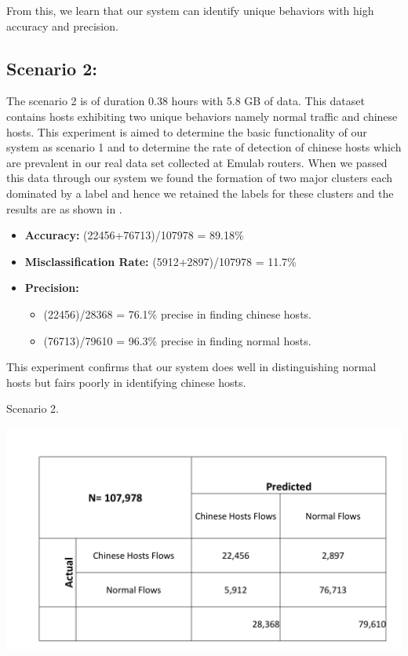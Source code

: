 From this, we learn that our system can identify unique behaviors with high accuracy and precision.

\subsection{Scenario 2:}
The scenario 2 is of duration 0.38 hours with 5.8 GB of data. This dataset contains hosts exhibiting two unique behaviors namely normal traffic and chinese hosts. This experiment is aimed to determine the basic functionality of our system as scenario 1 and to determine the rate of detection of chinese hosts which are prevalent in our real data set collected at Emulab routers. When we passed this data through our system we found the formation of two major clusters each dominated by a label and hence we retained the labels for these clusters and the results are as shown in .

\begin{itemize}
	\item \textbf{Accuracy:}  (22456+76713)/107978 = 89.18\%
	
	\item \textbf{Misclassification Rate:} (5912+2897)/107978 = 11.7\%
	
	\item \textbf{Precision:} 
	\begin{itemize}	
			
		\item (22456)/28368 = 76.1\% precise in finding chinese hosts.
		
		\item (76713)/79610 = 96.3\% precise in finding normal hosts.
		
	\end{itemize}
	
\end{itemize}

This experiment confirms that our system does well in distinguishing normal hosts but fairs poorly in identifying chinese hosts.

\begin{table}[t]
	\caption{Scenario 2.}%
	\centerline{\includegraphics[scale = 0.45]{scenario2.pdf}}	
\end{table}

